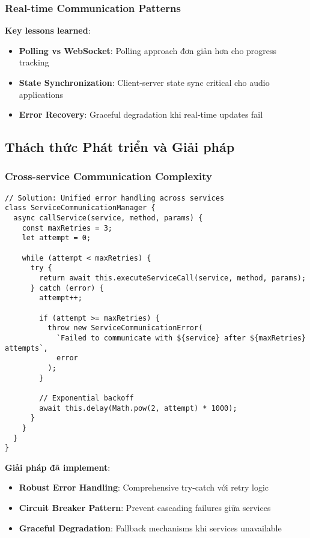 \documentclass[12pt,a4paper]{article}
\begin{document}
\subsubsection{Real-time Communication Patterns}

\textbf{Key lessons learned}:
\begin{itemize}
\item \textbf{Polling vs WebSocket}: Polling approach đơn giản hơn cho progress tracking
\item \textbf{State Synchronization}: Client-server state sync critical cho audio applications
\item \textbf{Error Recovery}: Graceful degradation khi real-time updates fail
\end{itemize}

\subsection{Thách thức Phát triển và Giải pháp}

\subsubsection{Cross-service Communication Complexity}

\begin{lstlisting}[caption={Unified error handling across services}]
// Solution: Unified error handling across services
class ServiceCommunicationManager {
  async callService(service, method, params) {
    const maxRetries = 3;
    let attempt = 0;
    
    while (attempt < maxRetries) {
      try {
        return await this.executeServiceCall(service, method, params);
      } catch (error) {
        attempt++;
        
        if (attempt >= maxRetries) {
          throw new ServiceCommunicationError(
            `Failed to communicate with ${service} after ${maxRetries} attempts`,
            error
          );
        }
        
        // Exponential backoff
        await this.delay(Math.pow(2, attempt) * 1000);
      }
    }
  }
}
\end{lstlisting}

\textbf{Giải pháp đã implement}:
\begin{itemize}
\item \textbf{Robust Error Handling}: Comprehensive try-catch với retry logic
\item \textbf{Circuit Breaker Pattern}: Prevent cascading failures giữa services
\item \textbf{Graceful Degradation}: Fallback mechanisms khi services unavailable
\end{itemize}
\end{document}
